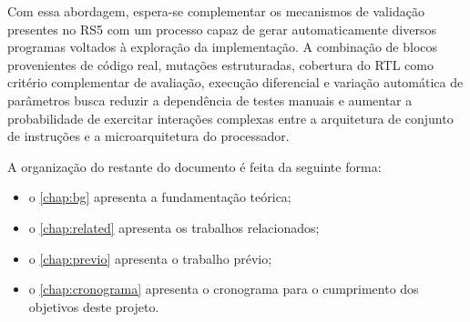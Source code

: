 Com essa abordagem, espera-se complementar os mecanismos de validação presentes no RS5 com um processo capaz de gerar automaticamente diversos programas voltados à exploração da implementação. 
A combinação de blocos provenientes de código real, mutações estruturadas, cobertura do RTL como critério complementar de avaliação, execução diferencial e variação automática de parâmetros busca reduzir a dependência de testes manuais e aumentar a probabilidade de exercitar interações complexas entre a arquitetura de conjunto de instruções e a microarquitetura do processador.

A organização do restante do documento é feita da seguinte forma:
\begin{itemize}
    \item o \cref{chap:bg} apresenta a fundamentação teórica;
    \item o \cref{chap:related} apresenta os trabalhos relacionados;
    \item o \cref{chap:previo} apresenta o trabalho prévio;
    \item o \cref{chap:cronograma} apresenta o cronograma para o cumprimento dos objetivos deste projeto.
\end{itemize}




